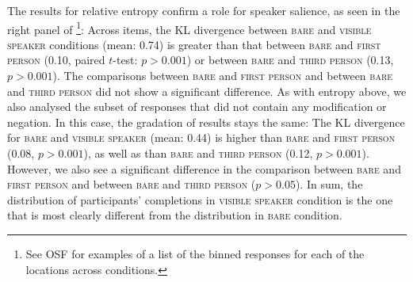 \documentclass[output=paper,colorlinks,citecolor=brown]{langscibook}
\begin{document}
The results for relative entropy confirm a role for speaker salience, as seen in the right panel of \footnote{See OSF for examples of a list of the binned responses for each of the locations across conditions.}: Across items, the KL divergence between \textsc{bare} and \textsc{visible speaker} conditions (mean: 0.74) is greater than that between \textsc{bare} and \textsc{first person} (0.10, paired $t$-test: $p > 0.001$) or between \textsc{bare} and \textsc{third person} (0.13, $p > 0.001$). The comparisons between \textsc{bare} and \textsc{first person} and between \textsc{bare} and \textsc{third person} did not show a significant difference. As with entropy above, we also analysed the subset of responses that did not contain any modification or negation. In this case, the gradation of results stays the same: The KL divergence for \textsc{bare} and \textsc{visible speaker} (mean: 0.44) is higher than \textsc{bare} and \textsc{first person} (0.08, $p > 0.001$), as well as than \textsc{bare} and \textsc{third person} (0.12, $p > 0.001$). However, we also see a significant difference in the comparison between \textsc{bare} and \textsc{first person} and between \textsc{bare} and \textsc{third person} ($p > 0.05$). In sum, the distribution of participants’ completions in \textsc{visible speaker} condition is the one that is most clearly different from the distribution in \textsc{bare} condition.
 
\end{document}
